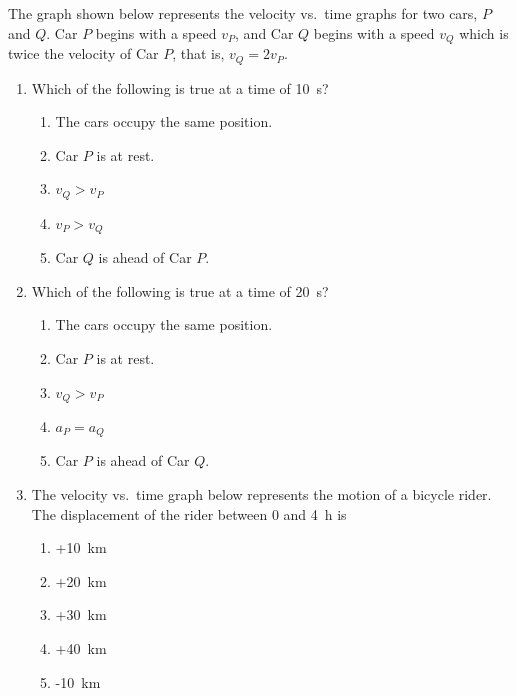 \documentclass{../../oss-apphys}
\begin{document}
\begin{multicols}{2}
  The graph shown below represents the velocity vs.\ time graphs for two cars,
  $P$ and $Q$. Car $P$ begins with a speed $v_P$, and Car $Q$ begins with a
  speed $v_Q$ which is twice the velocity of Car $P$, that is, $v_Q=2v_P$.
  \begin{center}
  \end{center}
  \begin{enumerate}[resume,leftmargin=18pt]
  \item Which of the following is true at a time of \SI{10}{\second}?
    \begin{enumerate}[noitemsep,topsep=0pt,leftmargin=18pt,label=(\Alph*)]
    \item The cars occupy the same position.
    \item Car $P$ is at rest.
    \item $v_Q>v_P$
    \item $v_P>v_Q$
    \item Car $Q$ is ahead of Car $P$.
    \end{enumerate}

  \item Which of the following is true at a time of \SI{20}{\second}?
    \begin{enumerate}[noitemsep,topsep=0pt,leftmargin=18pt,label=(\Alph*)]
    \item The cars occupy the same position.
    \item Car $P$ is at rest.
    \item $v_Q>v_P$
    \item $a_P=a_Q$
    \item Car $P$ is ahead of Car $Q$.
    \end{enumerate}
    \columnbreak
    
  \item The velocity vs.\ time graph below represents the motion of a bicycle
    rider. The displacement of the rider between $0$ and \SI{4}{\hour} is
    \begin{center}
    \end{center}
    \begin{enumerate}[noitemsep,topsep=0pt,leftmargin=18pt,label=(\Alph*)]
    \item +\SI{10}{\kilo\metre}
    \item +\SI{20}{\kilo\metre}
    \item +\SI{30}{\kilo\metre}
    \item +\SI{40}{\kilo\metre}
    \item -\SI{10}{\kilo\metre}
    \end{enumerate}
    

\end{enumerate}
\end{multicols}
\end{document}
